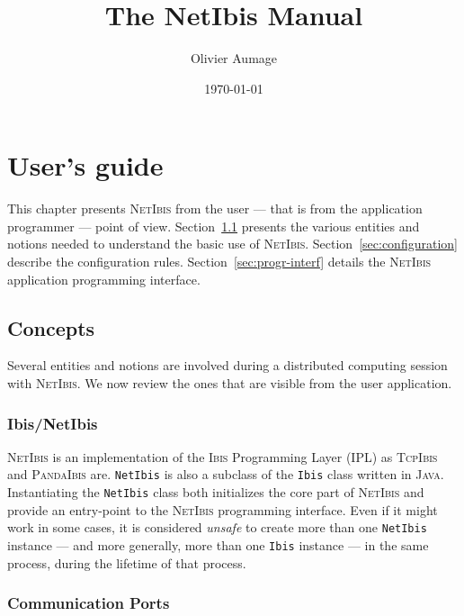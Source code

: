 \documentclass[11pt]{book}
\title{The NetIbis Manual}
\author{Olivier Aumage}
\date{\today}
\def\Ibis{\textsc{Ibis}\xspace}
\def\NetIbis{\textsc{NetIbis}\xspace}
\def\TcpIbis{\textsc{TcpIbis}\xspace}
\def\PandaIbis{\textsc{PandaIbis}\xspace}
\def\ibis{\texttt{Ibis}\xspace}
\def\netibis{\texttt{NetIbis}\xspace}
\begin{document}
\frontmatter
\maketitle

\tableofcontents
\listoffigures
\listoftables
\mainmatter

\chapter{User's guide}
\label{cha:users-guide}

This chapter presents \NetIbis from the user --- that is from the
application programmer --- point of view. Section~\ref{sec:concepts}
presents the various entities and notions needed to understand the
basic use of \NetIbis. Section~\ref{sec:configuration} describe the
configuration rules. Section~\ref{sec:progr-interf} details the \NetIbis
application programming interface.

\section{Concepts}
\label{sec:concepts}

Several entities and notions are involved during a distributed
computing session with \NetIbis. We now review the ones that are
visible from the user application.

\subsection{Ibis/NetIbis}
\label{sec:ibisnetibis}

\NetIbis is an implementation of the \Ibis Programming Layer (IPL) as
\TcpIbis and \PandaIbis are. \netibis is also a subclass of the \ibis
class written in \textsc{Java}. Instantiating the \netibis class both
initializes the core part of \NetIbis and provide an entry-point to
the \NetIbis programming interface. Even if it might work in some
cases, it is considered \emph{unsafe} to create more than one \netibis
instance --- and more generally, more than one \ibis instance --- in
the same process, during the lifetime of that process.

\subsection{Communication Ports}
\label{sec:communication-ports}
\end{document}
